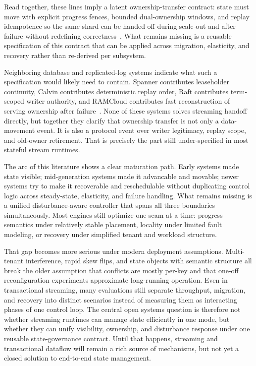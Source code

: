 \documentclass[acmsmall,screen,review]{acmart}
\begin{document}
Read together, these lines imply a latent ownership-transfer contract: state must move with explicit progress fences, bounded dual-ownership windows, and replay idempotence so the same shard can be handed off during scale-out and after failure without redefining correctness~\cite{fernandez2013osm,nasir2019megaphone,mao2025spacker,carbone2015asynchronous,zhao2024recovery}. What remains missing is a reusable specification of this contract that can be applied across migration, elasticity, and recovery rather than re-derived per subsystem.

Neighboring database and replicated-log systems indicate what such a specification would likely need to contain. Spanner contributes leaseholder continuity, Calvin contributes deterministic replay order, Raft contributes term-scoped writer authority, and RAMCloud contributes fast reconstruction of serving ownership after failure~\cite{corbett2012spanner,thomson2012calvin,ongaro2014raft,ousterhout2011ramcloud}. None of these systems solves streaming handoff directly, but together they clarify that ownership transfer is not only a data-movement event. It is also a protocol event over writer legitimacy, replay scope, and old-owner retirement. That is precisely the part still under-specified in most stateful stream runtimes.

The arc of this literature shows a clear maturation path. Early systems made state 
visible; mid-generation systems made it 
advancable and movable; newer systems try to make it 
recoverable and reschedulable without duplicating control logic across steady-state, elasticity, and failure handling. What remains missing is a unified disturbance-aware controller that spans all three boundaries simultaneously. Most engines still optimize one seam at a time: progress semantics under relatively stable placement, locality under limited fault modeling, or recovery under simplified tenant and workload structure.

That gap becomes more serious under modern deployment assumptions. Multi-tenant interference, rapid skew flips, and state objects with semantic structure all break the older assumption that conflicts are mostly per-key and that one-off reconfiguration experiments approximate long-running operation. Even in transactional streaming, many evaluations still separate throughput, migration, and recovery into distinct scenarios instead of measuring them as interacting phases of one control loop. The central open systems question is therefore not whether streaming runtimes can manage state efficiently in one mode, but whether they can unify visibility, ownership, and disturbance response under one reusable state-governance contract. Until that happens, streaming and transactional dataflow will remain a rich source of mechanisms, but not yet a closed solution to end-to-end state management.
\end{document}

